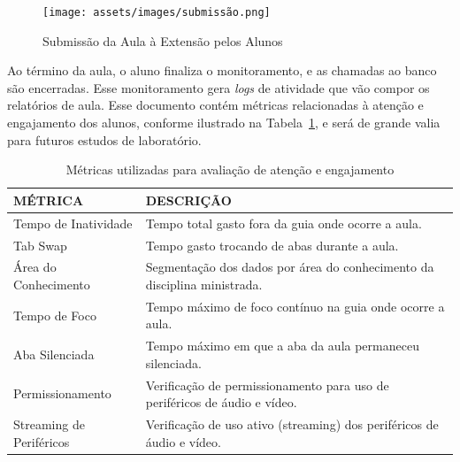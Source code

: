 \begin{figure}[ht]
\centering
\texttt{[image: assets/images/submissão.png]}
\caption{Submissão da Aula à Extensão pelos Alunos}
\label{fig:figura3}
\end{figure}

Ao término da aula, o aluno finaliza o monitoramento, e as chamadas ao banco são encerradas. Esse monitoramento gera \textit{logs} de atividade que vão compor os relatórios de aula.
Esse documento contém métricas relacionadas à atenção e engajamento dos alunos, conforme ilustrado na Tabela~\ref{tab:table1}, e será de grande valia para futuros estudos de laboratório.

\begin{table}[H]
\centering
\caption{Métricas utilizadas para avaliação de atenção e engajamento}
\label{tab:table1}
\begin{tabular}{|l|p{10cm}|}
\hline
\textbf{MÉTRICA} & \textbf{DESCRIÇÃO} \\
\hline
Tempo de Inatividade & Tempo total gasto fora da guia onde ocorre a aula. \\
\hline
Tab Swap & Tempo gasto trocando de abas durante a aula. \\
\hline
Área do Conhecimento & Segmentação dos dados por área do 
conhecimento da disciplina ministrada. \\
\hline
Tempo de Foco & Tempo máximo de foco contínuo na guia onde ocorre a aula. \\
\hline
Aba Silenciada & Tempo máximo em que a aba da aula permaneceu silenciada. \\
\hline
Permissionamento & Verificação de permissionamento para uso de periféricos de áudio e vídeo. \\
\hline
Streaming de Periféricos & Verificação de uso ativo (streaming) dos periféricos de áudio e vídeo. \\
\hline
\end{tabular}
\end{table}


